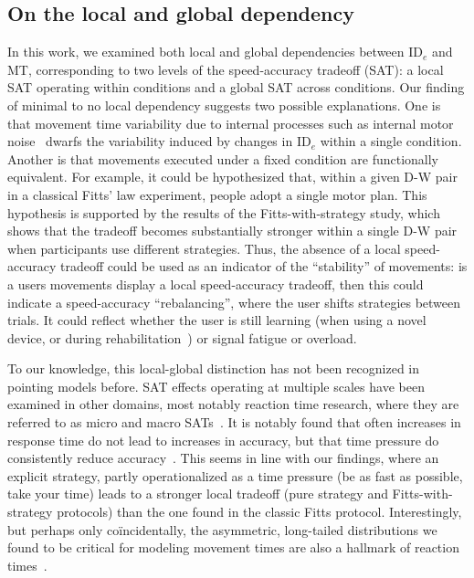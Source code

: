 \documentclass[acmlarge, manuscript,review]{acmart}
\newcommand{\ide}{\ensuremath{{\text{ID}_e}}\xspace}
\begin{document}
\subsection{On the local and global dependency}
In this work, we examined both local and global dependencies between \ide and MT, corresponding to two levels of the speed-accuracy tradeoff (SAT): a local SAT operating within conditions and a global SAT across conditions. Our finding of minimal to no local dependency suggests two possible explanations. One is that movement time variability due to internal processes such as internal motor noise~\cite{vanbeers2004,faisal2008} dwarfs the variability induced by changes in \ide within a single condition. Another is that movements executed under a fixed condition are functionally equivalent. For example, it could be hypothesized that, within a given D-W pair in a classical Fitts' law experiment, people adopt a single motor plan. This hypothesis is supported by the results of the Fitts-with-strategy study, which shows that the tradeoff becomes substantially stronger within a single D-W pair when participants use different strategies. 
Thus, the absence of a local speed-accuracy tradeoff could be used as an indicator of the ``stability'' of movements: is a users movements display a local speed-accuracy tradeoff, then this could indicate a speed-accuracy ``rebalancing'', where the user shifts strategies between trials. It could reflect whether the user is still learning (\eg when using a novel device, or during rehabilitation~\cite{sungeelee2024}) or signal fatigue or overload. 

To our knowledge, this local-global distinction has not been recognized in pointing models before. SAT effects operating at multiple scales have been examined in other domains, most notably reaction time research, where they are referred to as micro and macro SATs~\cite{dennis1996,domingue2022}. 
It is notably found that often increases in response time do not lead to increases in accuracy, but that time pressure do consistently reduce accuracy~\cite{domingue2022}. This seems in line with our findings, where an explicit strategy, partly operationalized as a time pressure (be as fast as possible, take your time) leads to a stronger local tradeoff (pure strategy and Fitts-with-strategy protocols) than the one found in the classic Fitts protocol.
Interestingly, but perhaps only coïncidentally, the asymmetric, long-tailed distributions we found to be critical for modeling movement times are also a hallmark of reaction times~\cite{luce1991}. 
\end{document}
